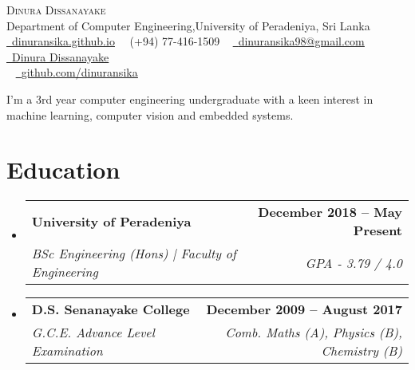 \documentclass[letterpaper,11pt]{article}
\makeatletter
\newcommand{\resumeSubheading}[4]{
  \vspace{-2pt}\item
    \begin{tabular*}{1.0\textwidth}[t]{l@{\extracolsep{\fill}}r}
      \textbf{#1} & \textbf{\small #2} \\
      \textit{\small#3} & \textit{\small #4} \\
    \end{tabular*}\vspace{-7pt}
}
\newcommand{\resumeSubSubheading}[2]{
    \item
    \begin{tabular*}{1\textwidth}{l@{\extracolsep{\fill}}r}
      \textit{\small#1} & \textit{\small #2} \\
    \end{tabular*}\vspace{-7pt}
}
\newcommand{\resumeSubHeadingListStart}{\begin{itemize}[leftmargin=0.0in, label={}]}
\newcommand{\resumeSubHeadingListEnd}{\end{itemize}}
\makeatother
\begin{document}
\begin{center}
    {\Huge \scshape Dinura Dissanayake} \\ \vspace{1pt}
    Department of Computer Engineering,University of Peradeniya, Sri Lanka  \\ \vspace{1pt}
    \href{https://dinuransika.github.io}{\raisebox{-0.2\height}\faCloud\ \underline{dinuransika.github.io}}~
    \small \raisebox{-0.1\height}\faPhone\ (+94) 77-416-1509 ~ \href{mailto:dinuransika98@gmail.com}{\raisebox{-0.2\height}\faEnvelope\  \underline{dinuransika98@gmail.com}} ~ 
    \href{https://www.linkedin.com/in/dinura-dissanayake/}{\raisebox{-0.2\height}\faLinkedin\ \underline{Dinura Dissanayake}} \\  ~
    \href{https://github.com/dinuransika}{\raisebox{-0.2\height}\faGithub\ \underline{github.com/dinuransika}}~ \\

    \vspace{-8pt}
\end{center}

\vspace{2pt}
I’m a 3rd year computer engineering undergraduate with a keen interest in machine learning, computer vision and embedded systems.
\vspace{-2pt}
\section{Education}
  \resumeSubHeadingListStart
    \resumeSubheading
      {University of Peradeniya}{December 2018 -- May Present}
      {BSc Engineering (Hons) | Faculty of Engineering }{GPA - 3.79 / 4.0}
      \resumeSubheading
      {D.S. Senanayake College}{December 2009 -- August 2017}
      {G.C.E. Advance Level Examination}{Comb. Maths (A), Physics (B), Chemistry (B)}
  \resumeSubHeadingListEnd

\end{document}
